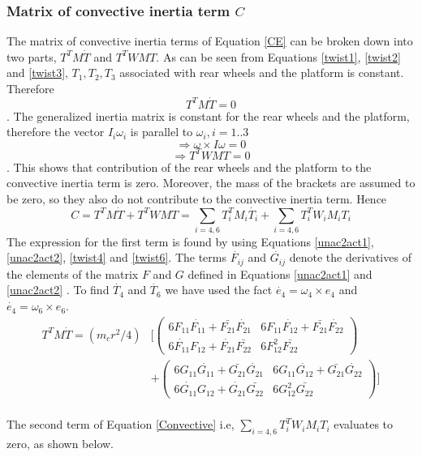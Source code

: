 \subsubsection{Matrix of convective inertia term $C$}
The matrix of convective inertia terms of Equation \ref{CE} can be broken down into two parts, $T^TM\dot{T}$ and $T^TWMT$.  As can be seen from Equations \ref{twist1}, \ref{twist2} and \ref{twist3},  $T_1,T_2,T_3$ associated with rear wheels and the platform is constant. Therefore \[T^TM\dot{T}=0\]. The generalized inertia matrix  is constant for the rear wheels and the platform, therefore the vector $I_i\omega_i$ is parallel to  $\omega_i, i=1..3$ \[\Rightarrow\omega\times I\omega=0\] \[\Rightarrow T^TWMT =0\]. This shows that contribution of the rear wheels and the platform  to the convective inertia term is zero. Moreover, the mass of the brackets are assumed to be zero, so they also do not contribute to the convective inertia term. Hence
\begin{equation}
\label{Convective}
C=T^TM\dot{T}+T^TWMT=\sum_{i=4,6}T^T_iM_i\dot{T_i}+\sum_{i=4,6}T_i^TW_iM_iT_i
\end{equation}
The expression for the first term is found by using Equations \ref{unac2act1}, \ref{unac2act2}, \ref{twist4} and \ref{twist6}. The terms $\dot{F_{ij}}$ and $\dot{G_{ij}}$ denote the derivatives of the elements of the matrix $F$ and $G$ defined in Equations \ref{unac2act1} and \ref{unac2act2} . To find $\dot{T_4}$ and  $ \dot{T_6}$ we have used the fact $\dot{e_4}=\omega_4 \times e_4 $ and $\dot{e_4}=\omega_6 \times e_6 $. 
\begin{equation}
\label{corr1}
\begin{split}
T^TM\dot{T}=
(m_cr^2/4)& \biggl[ \begin{pmatrix}
6F_{11}\dot{F_{11}}+\bar{F_{21}}\dot{F_{21}} & 6F_{11}\dot{F_{12}}+\bar{F_{21}}\dot{F_{22}}\\
6\dot{F_{11}}F_{12}+\dot{F_{21}}\bar{F_{22}} & 6F_{12}^2\bar{F_{22}}
\end{pmatrix}\\
&+\begin{pmatrix}
6G_{11}\dot{G_{11}}+\bar{G_{21}}\dot{G_{21}} & 6G_{11}\dot{G_{12}}+\bar{G_{21}}\dot{G_{22}}\\
6\dot{G_{11}}G_{12}+\dot{G_{21}}\bar{G_{22}} & 6G_{12}^2\bar{G_{22}}
\end{pmatrix} \biggr]
\end{split}
\end{equation}
\\
The second term of Equation \ref{Convective} i.e, $ \sum_{i=4,6}T_i^TW_iM_iT_i$ evaluates to zero, as shown below. 

